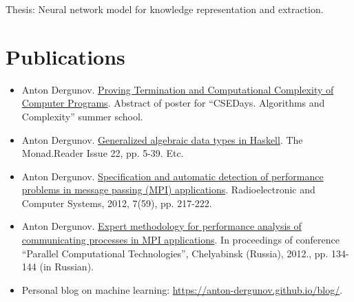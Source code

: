 \documentclass{article}
\begin{document}
Thesis: Neural network model for knowledge representation and extraction.


\section{Publications}

\begin{itemize}
\item Anton Dergunov. \href{http://anton-dergunov.github.io/publications/proving_complexity_v2.pdf}{Proving Termination and Computational Complexity of Computer Programs}. Abstract of poster for ``CSEDays. Algorithms and Complexity'' summer school.
\item Anton Dergunov. \href{http://themonadreader.files.wordpress.com/2013/08/issue221.pdf}{Generalized algebraic data types in Haskell}. The Monad.Reader Issue 22, pp. 5-39. Etc.
\item Anton Dergunov. \href{http://anton-dergunov.ru/publications/mpi_performance.pdf}{Specification and automatic detection of performance problems in message passing (MPI) applications}. Radioelectronic and Computer Systems, 2012, 7(59), pp. 217-222.
\item Anton Dergunov. \href{https://anton-dergunov.github.io/publications/expert_methodology.pdf}{Expert methodology for performance analysis of communicating processes in MPI applications}. In proceedings of conference ``Parallel Computational Technologies'', Chelyabinsk (Russia), 2012., pp. 134-144 (in Russian).
\item Personal blog on machine learning: \href{https://anton-dergunov.github.io/blog/}{https://anton-dergunov.github.io/blog/}.

\end{itemize}
\end{document}
